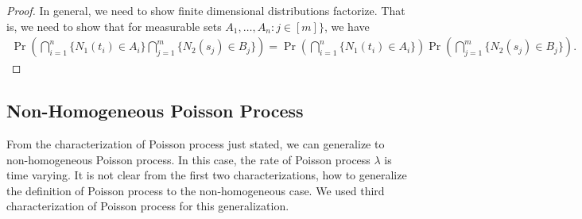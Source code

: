 \documentclass[a4paper,10pt,english]{article}
\begin{document}
\begin{proof}
In general, we need to show finite dimensional distributions factorize. That is, we need to show that for measurable sets $A_1, \hdots, A_n: j \in [m]\}$, we have \begin{align*}
   \Pr\left(\bigcap_{i=1}^n\{N_{1}(t_{i})\in A_{i}\}\bigcap_{j=1}^m\{N_{2}(s_{j})\in B_{j}\}\right)
   =\Pr\left(\bigcap_{i=1}^n\{N_{1}(t_{i})\in A_{i}\}\right)\Pr\left(\bigcap_{j=1}^m\{N_{2}(s_{j})\in B_{j}\}\right).
\end{align*}
\end{proof}

\subsection{Non-Homogeneous Poisson Process}
From the characterization of Poisson process just stated, we can generalize to non-homogeneous Poisson process. In this case, the rate of Poisson process $\lambda$ is time varying. It is not clear from the first two characterizations, how to generalize the definition of Poisson process to the non-homogeneous case. We used third characterization of Poisson process for this generalization. 
\end{document}
